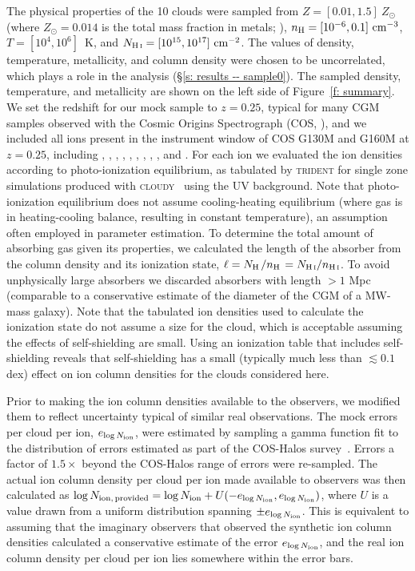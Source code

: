 \documentclass[fleqn,usenatbib]{mnras}
\begin{document}
The physical properties of the 10 clouds were sampled from $Z=[ 0.01, 1.5 ]~Z_\odot$ (where $Z_\odot = 0.014$ is the total mass fraction in metals; \citealt{asplund2009Chemical}), $n_{\rm H} = [ 10^{-6}, 0.1 ]~{\rm cm^{-3}}$, $T = [ 10^4, 10^6 ]$~K, and $N_{\ion{H}{I}} = [ 10^{15}, 10^{17} ]~{\rm cm^{-2}}$.
The values of density, temperature, metallicity, and  column density were chosen to be uncorrelated, which plays a role in the analysis (\S\ref{s: results -- sample0}).
The sampled density, temperature, and metallicity are shown on the left side of Figure~\ref{f: summary}.
We set the redshift for our mock sample to $z=0.25$, typical for many CGM samples observed with the Cosmic Origins Spectrograph (COS, \citealt{green2012COSMIC}), and we included all ions present in the instrument window of COS G130M and G160M at $z=0.25$, including , , , , , , ,  , , and .
For each ion we evaluated the ion densities according to photo-ionization equilibrium, as tabulated by \textsc{trident} for single zone simulations produced with \textsc{cloudy}~\citep{ferland20132013} using the \cite{haardt2012RADIATIVE} UV background.
Note that photo-ionization equilibrium does not assume cooling-heating equilibrium (where gas is in heating-cooling balance, resulting in constant temperature),
an assumption often employed in parameter estimation.
To determine the total amount of absorbing gas given its properties, we calculated the length of the absorber from the  column density and its ionization state, $\ell = N_{\ion{H}{}} / n_{\ion{H}{}} = N_{\ion{H}{I}} / n_{\ion{H}{I}}$.
To avoid unphysically large absorbers we discarded absorbers with length $> 1$ Mpc (comparable to a conservative estimate of the diameter of the CGM of a MW-mass galaxy).
Note that the tabulated ion densities used to calculate the ionization state do not assume a size for the cloud, which is acceptable assuming the effects of self-shielding are small.
Using an ionization table that includes self-shielding reveals that self-shielding has a small (typically much less than $\lesssim 0.1$ dex) effect on ion column densities for the clouds considered here.

Prior to making the ion column densities available to the observers, we modified them to reflect uncertainty typical of similar real observations.
The mock errors per cloud per ion, $e_{\log N_{\rm ion}}$, were estimated by sampling a gamma function fit to the distribution of errors estimated as part of the COS-Halos survey~\citep{werk2013COSHALOS}.
Errors a factor of $1.5\times$ beyond the COS-Halos range of errors were re-sampled.
The actual ion column density per cloud per ion made available to observers was then calculated as $\log N_{\rm ion,\,provided} = \log N_{\rm ion} + U(-e_{\log N_{\rm ion}}, e_{\log N_{\rm ion}} )$, where $U$ is a value drawn from a uniform distribution spanning $\pm e_{\log N_{\rm ion}}$.
This is equivalent to assuming that the imaginary observers that observed the synthetic ion column densities calculated a conservative estimate of the error $e_{\log N_{\rm ion}}$, and the real ion column density per cloud per ion lies somewhere within the error bars.
\end{document}

